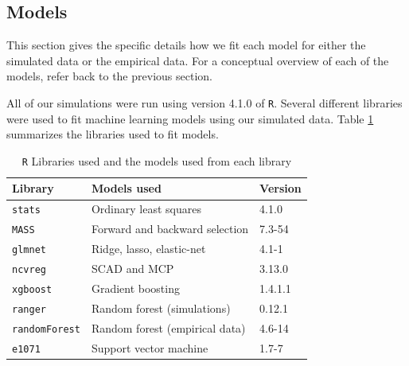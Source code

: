 \documentclass{article}
\begin{document}
\subsection{Models}

This section gives the specific details how we fit each model for either the simulated data or the empirical data. For a conceptual overview of each of the models, refer back to the previous section.

All of our simulations were run using version 4.1.0 of \lstinline!R!. Several different libraries were used to fit machine learning models using our simulated data. Table \ref{tab:model-libraries} summarizes the libraries used to fit models.

\begin{table}[h]
	\centering
	\caption{\lstinline!R! Libraries used and the models used from each library}
	\label{tab:model-libraries}
	\begin{tabular}{lll}\hline
		\textbf{Library}    	  & \textbf{Models used}                                 & \textbf{Version} \\ \hline
		\lstinline!stats!   	  & Ordinary least squares                               & 4.1.0            \\
		\lstinline!MASS!    	  & Forward and backward selection                       & 7.3-54           \\
		\lstinline!glmnet!  	  & Ridge, lasso, elastic-net                            & 4.1-1            \\
		\lstinline!ncvreg! 	      & SCAD and MCP                                         & 3.13.0           \\
		\lstinline!xgboost! 	  & Gradient boosting                                    & 1.4.1.1          \\
		\lstinline!ranger!  	  & Random forest (simulations)                          & 0.12.1           \\
		\lstinline!randomForest!  & Random forest (empirical data)                       & 4.6-14           \\
		\lstinline!e1071!   	  & Support vector machine                               & 1.7-7            \\\hline
	\end{tabular}
\end{table}
\end{document}
